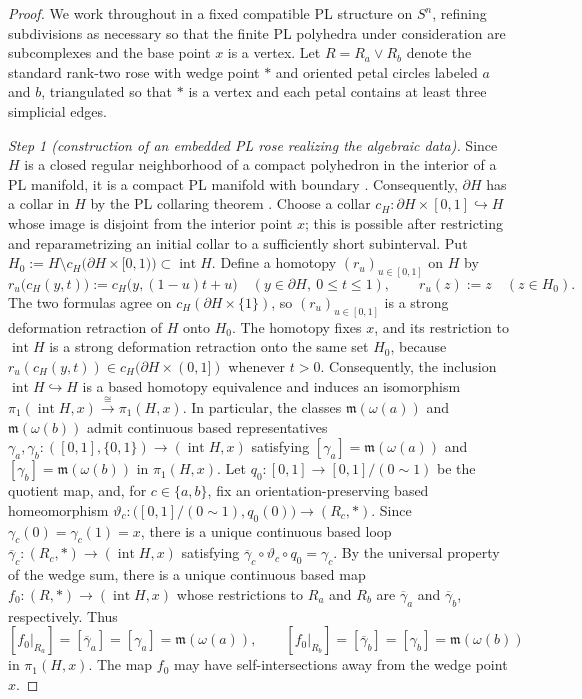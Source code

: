 \documentclass[12pt,oneside,a4paper]{article}
\theoremstyle{mytheorem}
\theoremstyle{remark}
\theoremstyle{definition}
\begin{document}
\begin{proof}
We work throughout in a fixed compatible PL structure on $S^n$, refining
subdivisions as necessary so that the finite PL polyhedra under
consideration are subcomplexes and the base point $x$ is a vertex.  Let
$R=R_a\vee R_b$ denote the standard rank-two rose with wedge point $*$ and
oriented petal circles labeled $a$ and $b$, triangulated so that $*$ is a
vertex and each petal contains at least three simplicial edges.



\smallskip\noindent\emph{Step 1 (construction of an embedded PL rose realizing the algebraic data).}
Since $H$ is a closed regular neighborhood of a compact polyhedron in the
interior of a PL manifold, it is a compact PL manifold with boundary
\cite[Theorem~3.6]{zbMATH01714503}.  Consequently, $\partial H$ has a
collar in $H$ by the PL collaring theorem
\cite[Corollary~2.5]{zbMATH01714503}.  Choose a collar
$c_H \colon \partial H \times [0,1] \hookrightarrow H$
whose image is disjoint from the interior point \(x\); this is possible after
restricting and reparametrizing an initial collar to a sufficiently short
subinterval.  Put
$H_0:=H\setminus c_H\bigl(\partial H\times[0,1)\bigr)
   \subset\operatorname{int}H$.
Define a homotopy $(r_u)_{u\in[0,1]}$ on $H$ by
\[
r_u\bigl(c_H(y,t)\bigr):=c_H\bigl(y,(1-u)t+u\bigr)
\quad (y\in\partial H,\ 0\leq t\leq1),
\qquad
r_u(z):=z\quad(z\in H_0).
\]
The two formulas agree on $c_H(\partial H\times\{1\})$, so
$(r_u)_{u\in[0,1]}$ is a strong deformation retraction of $H$ onto
$H_0$.  The homotopy fixes $x$, and its restriction to
$\operatorname{int}H$ is a strong deformation retraction onto the same
set $H_0$, because
$r_u(c_H(y,t))\in c_H(\partial H\times(0,1])$ whenever $t>0$.  Consequently,
the inclusion $\operatorname{int}H\hookrightarrow H$ is a based homotopy
equivalence and induces an isomorphism
$\pi_1(\operatorname{int}H,x)\xrightarrow{\cong}\pi_1(H,x)$.
In particular, the classes $\mathfrak{m}(\omega(a))$ and
$\mathfrak{m}(\omega(b))$ admit continuous based representatives
\(\gamma_a,\gamma_b:([0,1],\{0,1\})\to
(\operatorname{int}H,x)\)
satisfying $[\gamma_a]=\mathfrak{m}(\omega(a))$ and
$[\gamma_b]=\mathfrak{m}(\omega(b))$ in $\pi_1(H,x)$.  Let
$q_0:[0,1]\to[0,1]/(0\sim1)$ be the quotient map, and, for
$c\in\{a,b\}$, fix an orientation-preserving based homeomorphism
$\vartheta_c:\bigl([0,1]/(0\sim1),q_0(0)\bigr)\to(R_c,*)$.  Since
$\gamma_c(0)=\gamma_c(1)=x$, there is a unique continuous based loop
$\overline\gamma_c:(R_c,*)\to(\operatorname{int}H,x)$ satisfying
$\overline\gamma_c\circ\vartheta_c\circ q_0=\gamma_c$.  By the universal
property of the wedge sum, there is a unique continuous based map
$f_0:(R,*)\to(\operatorname{int}H,x)$ whose restrictions to $R_a$ and
$R_b$ are $\overline\gamma_a$ and $\overline\gamma_b$, respectively.  Thus
\[
[f_0|_{R_a}]=[\overline\gamma_a]=[\gamma_a]=\mathfrak{m}(\omega(a)),
\qquad
[f_0|_{R_b}]=[\overline\gamma_b]=[\gamma_b]=\mathfrak{m}(\omega(b))
\]
in $\pi_1(H,x)$.  The map $f_0$ may have self-intersections away from the
wedge point $x$.


\end{proof}
\end{document}
